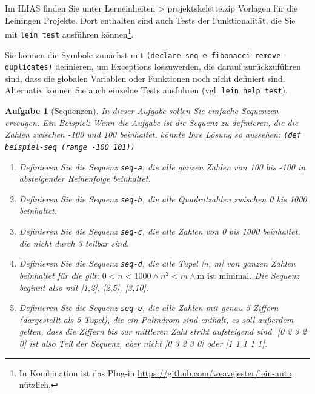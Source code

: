 \documentclass[11pt,a4paper]{article}
\newcounter{numb}
\theoremstyle{break}
\newtheorem{aufgabe}{Aufgabe}[numb]
\begin{document}
Im ILIAS finden Sie unter Lerneinheiten > projektskelette.zip Vorlagen f\"ur die Leiningen Projekte.
Dort enthalten sind auch Tests der Funktionalit\"at, die Sie mit \verb|lein test| ausf\"uhren k\"onnen\footnote{In Kombination ist das Plug-in \url{https://github.com/weavejester/lein-auto} n\"utzlich.}.

Sie k\"onnen die Symbole zun\"achst mit \verb|(declare seq-e fibonacci remove-duplicates)| definieren,
um Exceptions loszuwerden, die darauf zur\"uckzuf\"uhren sind, dass die globalen Variablen oder Funktionen noch nicht definiert sind.
Alternativ k\"onnen Sie auch einzelne Tests ausf\"uhren (vgl. \verb|lein help test|).

\begin{aufgabe}[Sequenzen]

In dieser Aufgabe sollen Sie einfache Sequenzen erzeugen. Ein Beispiel: Wenn die Aufgabe ist die Sequenz zu definieren, die die Zahlen zwischen -100 und 100 beinhaltet, k\"onnte Ihre L\"osung so aussehen: \texttt{(def beispiel-seq (range -100 101))}
  

\begin{enumerate}[label=\alph*)]
  \item Definieren Sie die Sequenz \verb|seq-a|, die alle ganzen Zahlen von 100 bis -100 in absteigender Reihenfolge beinhaltet.
  \item Definieren Sie die Sequenz \verb|seq-b|, die alle Quadratzahlen zwischen 0 bis 1000 beinhaltet.
  \item Definieren Sie die Sequenz \verb|seq-c|, die alle Zahlen von 0 bis 1000 beinhaltet, die nicht durch 3 teilbar sind.
  \item Definieren Sie die Sequenz \verb|seq-d|, die alle Tupel [n, m] von ganzen Zahlen beinhaltet f\"ur die gilt: $0 < n < 1000 \wedge n^2 < m \wedge \text{m ist minimal}$. Die Sequenz beginnt also mit [1,2], [2,5], [3,10].
  \item Definieren Sie die Sequenz \verb|seq-e|, die alle Zahlen mit genau 5 Ziffern (dargestellt als 5 Tupel), die ein Palindrom sind enth\"alt, es soll au\ss{}erdem gelten, dass die Ziffern bis zur mittleren Zahl strikt aufsteigend sind. [0 2 3 2 0] ist also Teil der Sequenz, aber nicht [0 3 2 3 0] oder [1 1 1 1 1].
  
    
  \end{enumerate}
\end{aufgabe}
\end{document}
